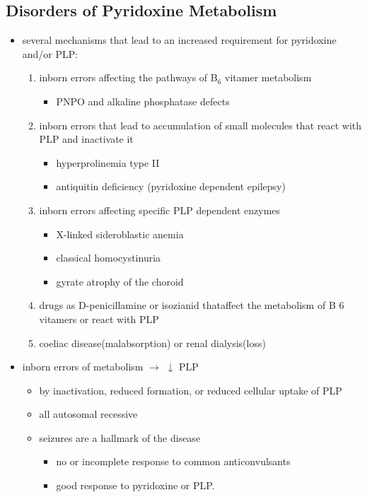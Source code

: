 \documentclass{scrartcl}
\begin{document}
\subsection{Disorders of Pyridoxine Metabolism}
\label{sec:orgfdbf7aa}
\begin{itemize}
\item several mechanisms that lead to an increased requirement for
pyridoxine and/or PLP:
\begin{enumerate}
\item inborn errors affecting the pathways of B\(_{\text{6}}\) vitamer metabolism
\begin{itemize}
\item PNPO and alkaline phosphatase defects
\end{itemize}
\item inborn errors that lead to accumulation of small molecules that
react with PLP and inactivate it
\begin{itemize}
\item hyperprolinemia type II
\item antiquitin deficiency (pyridoxine dependent epilepsy)
\end{itemize}
\item inborn errors affecting specific PLP dependent enzymes
\begin{itemize}
\item X-linked sideroblastic anemia
\item classical homocystinuria
\item gyrate atrophy of the choroid
\end{itemize}
\item drugs as D-penicillamine or isozianid thataffect the metabolism of
B 6 vitamers or react with PLP
\item coeliac disease(malabsorption) or renal dialysis(loss)
\end{enumerate}
\item inborn errors of metabolism \(\to\) \(\downarrow\) PLP
\begin{itemize}
\item by inactivation, reduced formation, or reduced cellular uptake of PLP
\item all autosomal recessive
\item seizures are a hallmark of the disease
\begin{itemize}
\item no or incomplete response to common anticonvulsants
\item good response to pyridoxine or PLP.
\end{itemize}
\end{itemize}
\end{itemize}
\end{document}
